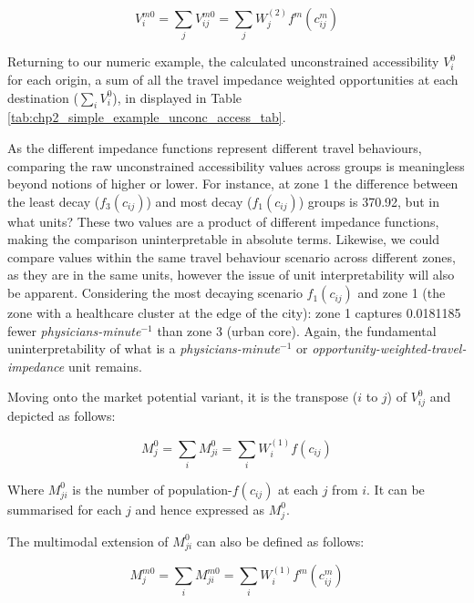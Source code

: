 \documentclass[
11pt, %
oneside, %
english, %
singlespacing, %
]{macthesis} %
\begin{document}
\begin{equation}
\label{eq:unconstrained-multimodal-accessibility}
V^{m0}_{i} = \sum_j V^{m0}_{ij} =  \sum_j W_j^{(2)} f^m(c^m_{ij})
\end{equation} 

Returning to our numeric example, the calculated unconstrained accessibility \(V^0_{i}\) for each origin, a sum of all the travel impedance weighted opportunities at each destination (\(\sum_i V^0_{i}\)), in displayed in Table \ref{tab:chp2_simple_example_unconc_access_tab}.



As the different impedance functions represent different travel behaviours, comparing the raw unconstrained accessibility values across groups is meaningless beyond notions of higher or lower. For instance, at zone 1 the difference between the least decay (\(f_3(c_{ij})\)) and most decay (\(f_1(c_{ij})\)) groups is 370.92, but in what units? These two values are a product of different impedance functions, making the comparison uninterpretable in absolute terms. Likewise, we could compare values within the same travel behaviour scenario across different zones, as they are in the same units, however the issue of unit interpretability will also be apparent. Considering the most decaying scenario \(f_1(c_{ij})\) and zone 1 (the zone with a healthcare cluster at the edge of the city): zone 1 captures 0.0181185 fewer \emph{physicians-minute\(^{-1}\)} than zone 3 (urban core). Again, the fundamental uninterpretability of what is a \emph{physicians-minute\(^{-1}\)} or \emph{opportunity-weighted-travel-impedance} unit remains.

Moving onto the market potential variant, it is the transpose (\(i\) to \(j\)) of \(V^0_{ij}\) and depicted as follows:

\begin{equation}
\label{eq:unconstrained-market}
M_j^0 = \sum_i M^0_{ji} = \sum_i W_i^{(1)} f(c_{ij})
\end{equation} 

Where \(M^0_{ji}\) is the number of population-\(f(c_{ij})\) at each \(j\) from \(i\). It can be summarised for each \(j\) and hence expressed as \(M^0_j\).

The multimodal extension of \(M^0_{ji}\) can also be defined as follows:

\begin{equation}
\label{eq:unconstrained-multimodal-accessibility}
M^{m0}_{j} = \sum_i M^{m0}_{ji} =  \sum_i W_i^{(1)} f^m(c^m_{ij})
\end{equation} 
\end{document}
